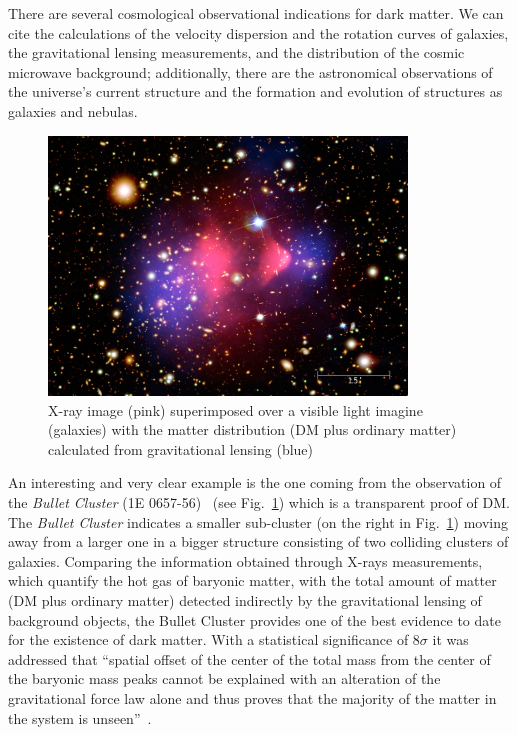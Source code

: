 There are several cosmological observational indications for dark matter. We can cite the calculations of the velocity dispersion and the rotation curves of galaxies, the gravitational lensing measurements, and the distribution of the cosmic microwave background; additionally, there are the astronomical observations of the universe's current structure and the formation and evolution of structures as galaxies and nebulas.\\
\begin{figure}[h]
\centering
\includegraphics[width=0.85\textwidth]{Figures/c1/bullet.jpg}
\caption{X-ray image (pink) superimposed over a visible light imagine (galaxies) with the matter distribution (DM plus ordinary matter) calculated from gravitational lensing (blue)~\cite{webpage_bullet}}
\label{fig:bullet}
\end{figure}
An interesting and very clear example is the one coming from the observation of the \emph{Bullet Cluster} (1E 0657-56)~\cite{Clowe_2004} (see Fig.~\ref{fig:bullet}) which is a transparent proof of DM. The \emph{Bullet Cluster} indicates a smaller sub-cluster (on the right in Fig.~\ref{fig:bullet}) moving away from a larger one in a bigger structure consisting of two colliding clusters of galaxies. Comparing the information obtained through X-rays measurements, which quantify the hot gas of baryonic matter, with the total amount of matter (DM plus ordinary matter) detected indirectly by the gravitational lensing of background objects, the Bullet Cluster provides 
one of the best evidence to date for the existence of dark matter. With a statistical significance of 8$\sigma$ it was addressed that ``spatial offset of the center of the total mass from the center of the baryonic mass peaks cannot be explained with an alteration of the gravitational force law alone and thus proves that the majority of the matter in the system is unseen''~\cite{Clowe_2006}.

